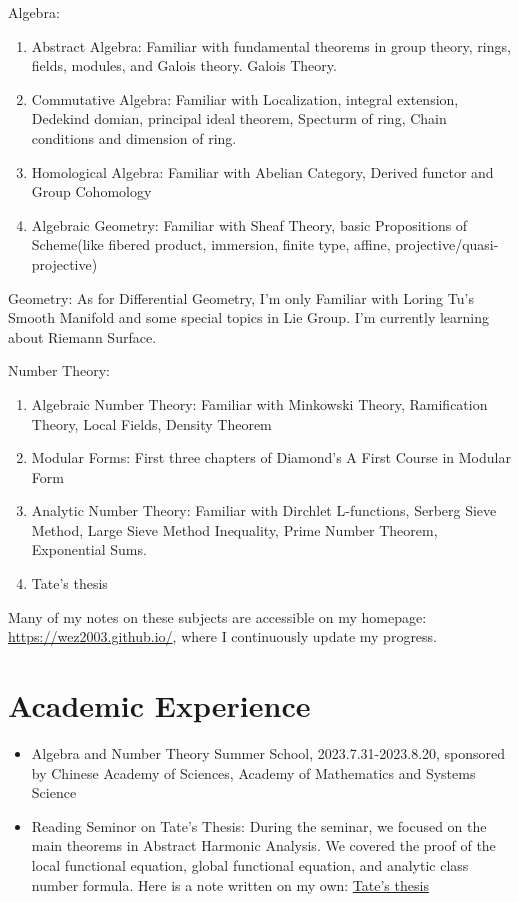 \documentclass[12pt]{article}
\newenvironment{enu}{\begin{enumerate}[(1)]}{\end{enumerate}}
\theoremstyle{definition}
\begin{document}
Algebra:
\begin{enu} 
\item Abstract Algebra: Familiar with fundamental theorems in group theory, rings, fields, modules, and Galois theory.
Galois Theory.
\item Commutative Algebra: Familiar with Localization, integral extension, Dedekind domian, principal ideal theorem, 
Specturm of ring, Chain conditions and dimension of ring. 

\item Homological Algebra: Familiar with Abelian Category, Derived functor and Group Cohomology

\item Algebraic Geometry: Familiar with 
Sheaf Theory, basic Propositions of Scheme(like fibered product, immersion, finite type, affine, projective/quasi-projective)
\end{enu}

Geometry: As for Differential Geometry, I'm only Familiar with Loring Tu's Smooth Manifold 
and some special topics in Lie Group. 
I'm currently learning about Riemann Surface. 

Number Theory: 
\begin{enu}
    \item Algebraic Number Theory: Familiar with Minkowski Theory, Ramification Theory, Local Fields, Density Theorem
    \item Modular Forms: First three chapters of Diamond's A First Course in Modular Form
    \item Analytic Number Theory: Familiar with Dirchlet L-functions, Serberg Sieve Method, Large Sieve Method Inequality, 
    Prime Number Theorem, Exponential Sums. 
    \item Tate's thesis
\end{enu}

Many of my notes on these subjects are accessible on my homepage: \url{https://wez2003.github.io/}, 
where I continuously update my progress.



\section{Academic Experience}
\begin{itemize}
    \item Algebra and Number Theory Summer School, 2023.7.31-2023.8.20, sponsored by Chinese Academy of Sciences, Academy of Mathematics and Systems Science
    \item Reading Seminor on Tate's Thesis: During the seminar, we focused on the main theorems in Abstract Harmonic Analysis. We covered the proof of the local functional equation, global functional equation, and analytic class number formula.
    Here is a note written on my own: \href{https://wez2003.github.io/paper/tatethesis.pdf}{Tate's thesis} 
\end{itemize}
\end{document}
